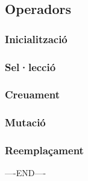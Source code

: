 \documentclass[titlepage,a4paper,12pt]{book}
\begin{document}
\subsection{Operadors} %
\label{sub:Operadors}

\subsubsection{Inicialització} %
\label{ssub:Inicialitzacio}

\subsubsection{Sel·lecció} %
\label{ssub:Seleccio}

\subsubsection{Creuament} %
\label{ssub:Creuament}

\subsubsection{Mutació} %
\label{ssub:Mutacio}

\subsubsection{Reemplaçament} %
\label{ssub:Reemplacament}










----END----

\end{document}
